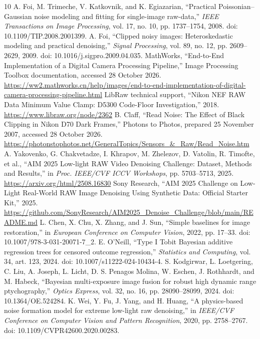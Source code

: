 \documentclass[10pt,twocolumn,journal]{IEEEtran}
\begin{document}
\begin{thebibliography}{10}
\fontsize{7.8}{8.1}\selectfont
\setlength{\itemsep}{0pt}
 A. Foi, M. Trimeche, V. Katkovnik, and K. Egiazarian, ``Practical Poissonian--Gaussian noise modeling and fitting for single-image raw-data,'' \emph{IEEE Transactions on Image Processing}, vol. 17, no. 10, pp. 1737--1754, 2008. doi: 10.1109/TIP.2008.2001399.
 A. Foi, ``Clipped noisy images: Heteroskedastic modeling and practical denoising,'' \emph{Signal Processing}, vol. 89, no. 12, pp. 2609--2629, 2009. doi: 10.1016/j.sigpro.2009.04.035.
 MathWorks, ``End-to-End Implementation of a Digital Camera Processing Pipeline,'' Image Processing Toolbox documentation, accessed 28 October 2026. \url{https://ww2.mathworks.cn/help/images/end-to-end-implementation-of-digital-camera-processing-pipeline.html}
 LibRaw technical support, ``Nikon NEF RAW Data Minimum Value Clamp: D5300 Code-Floor Investigation,'' 2018. \url{https://www.libraw.org/node/2362}
 B. Claff, ``Read Noise: The Effect of Black Clipping in Nikon D70 Dark Frames,'' Photons to Photos, prepared 25 November 2007, accessed 28 October 2026. \url{https://photonstophotos.net/GeneralTopics/Sensors_&_Raw/Read_Noise.htm}
 A. Yakovenko, G. Chakvetadze, I. Khrapov, M. Zhelezov, D. Vatolin, R. Timofte, et al., ``AIM 2025 Low-light RAW Video Denoising Challenge: Dataset, Methods and Results,'' in \emph{Proc. IEEE/CVF ICCV Workshops}, pp. 5703--5713, 2025. \url{https://arxiv.org/html/2508.16830}
 Sony Research, ``AIM 2025 Challenge on Low-Light Real-World RAW Image Denoising Using Synthetic Data: Official Starter Kit,'' 2025. \url{https://github.com/SonyResearch/AIM2025_Denoise_Challenge/blob/main/README.md}
 L. Chen, X. Chu, X. Zhang, and J. Sun, ``Simple baselines for image restoration,'' in \emph{European Conference on Computer Vision}, 2022, pp. 17--33. doi: 10.1007/978-3-031-20071-7\_2.
 E. O'Neill, ``Type I Tobit Bayesian additive regression trees for censored outcome regression,'' \emph{Statistics and Computing}, vol. 34, art. 123, 2024. doi: 10.1007/s11222-024-10434-4.
 S. Kodgirwar, L. Loetgering, C. Liu, A. Joseph, L. Licht, D. S. Penagos Molina, W. Eschen, J. Rothhardt, and M. Habeck, ``Bayesian multi-exposure image fusion for robust high dynamic range ptychography,'' \emph{Optics Express}, vol. 32, no. 16, pp. 28090--28099, 2024. doi: 10.1364/OE.524284.
 K. Wei, Y. Fu, J. Yang, and H. Huang, ``A physics-based noise formation model for extreme low-light raw denoising,'' in \emph{IEEE/CVF Conference on Computer Vision and Pattern Recognition}, 2020, pp. 2758--2767. doi: 10.1109/CVPR42600.2020.00283.

\end{thebibliography}
\end{document}
